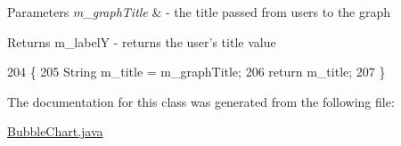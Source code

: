 \begin{DoxyParams}{Parameters}
{\em m\-\_\-graph\-Title} & -\/ the title passed from users to the graph \\
\hline
\end{DoxyParams}
\begin{DoxyReturn}{Returns}
m\-\_\-label\-Y -\/ returns the user's title value 
\end{DoxyReturn}

\begin{DoxyCode}
204                                                   \{
205         String m\_title = m\_graphTitle;
206         \textcolor{keywordflow}{return} m\_title;
207     \} 
\end{DoxyCode}


The documentation for this class was generated from the following file\-:\begin{DoxyCompactItemize}
\item 
\hyperlink{_bubble_chart_8java}{Bubble\-Chart.\-java}\end{DoxyCompactItemize}
